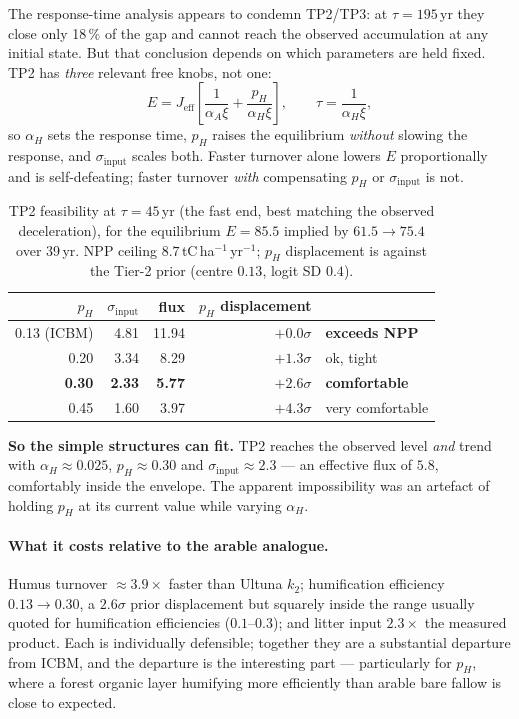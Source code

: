 \documentclass[11pt]{article}
\newcommand{\sinput}{\sigma_{\mathrm{input}}}
\begin{document}
The response-time analysis appears to condemn TP2/TP3: at $\tau = 195$\,yr they close only
18\,\% of the gap and cannot reach the observed accumulation at any initial state. But that
conclusion depends on which parameters are held fixed. TP2 has \emph{three} relevant free knobs,
not one:
\[
E = J_{\mathrm{eff}}\left[\frac{1}{\alpha_A \xi} + \frac{p_H}{\alpha_H \xi}\right],
\qquad \tau = \frac{1}{\alpha_H \xi},
\]
so $\alpha_H$ sets the response time, $p_H$ raises the equilibrium \emph{without} slowing the
response, and $\sinput$ scales both. Faster turnover alone lowers $E$ proportionally and is
self-defeating; faster turnover \emph{with} compensating $p_H$ or $\sinput$ is not.

\begin{table}[H]\centering\small
\caption{TP2 feasibility at $\tau = 45$\,yr (the fast end, best matching the observed
deceleration), for the equilibrium $E = 85.5$ implied by $61.5 \rightarrow 75.4$ over 39\,yr.
NPP ceiling $8.7$\,tC\,ha$^{-1}$\,yr$^{-1}$; $p_H$ displacement is against the Tier-2 prior
(centre $0.13$, logit SD $0.4$).}
\begin{tabular}{rrrrl}
\toprule
$p_H$ & $\sinput$ & flux & $p_H$ displacement & \\
\midrule
0.13 (ICBM) & 4.81 & 11.94 & $+0.0\sigma$ & \textbf{exceeds NPP}\\
0.20        & 3.34 & 8.29  & $+1.3\sigma$ & ok, tight\\
\textbf{0.30} & \textbf{2.33} & \textbf{5.77} & $+2.6\sigma$ & \textbf{comfortable}\\
0.45        & 1.60 & 3.97  & $+4.3\sigma$ & very comfortable\\
\bottomrule
\end{tabular}
\end{table}

\noindent \textbf{So the simple structures can fit.} TP2 reaches the observed level \emph{and}
trend with $\alpha_H \approx 0.025$, $p_H \approx 0.30$ and $\sinput \approx 2.3$ --- an effective
flux of $5.8$, comfortably inside the envelope. The apparent impossibility was an artefact of
holding $p_H$ at its current value while varying $\alpha_H$.

\paragraph{What it costs relative to the arable analogue.} Humus turnover $\approx 3.9\times$
faster than Ultuna $k_2$; humification efficiency $0.13 \rightarrow 0.30$, a $2.6\sigma$ prior
displacement but squarely inside the range usually quoted for humification efficiencies
($0.1$--$0.3$); and litter input $2.3\times$ the measured product. Each is individually
defensible; together they are a substantial departure from ICBM, and the departure is the
interesting part --- particularly for $p_H$, where a forest organic layer humifying more
efficiently than arable bare fallow is close to expected.
\end{document}
